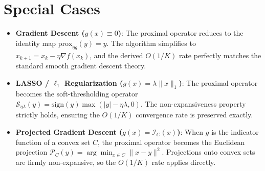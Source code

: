 \documentclass{article}
\begin{document}
\section*{Special Cases}
\begin{itemize}
\item \textbf{Gradient Descent ($g(x) \equiv 0$)}: The proximal operator reduces to the identity map $\text{prox}_{\eta g}(y) = y$. The algorithm simplifies to $x_{k+1} = x_k - \eta \nabla f(x_k)$, and the derived $O(1/K)$ rate perfectly matches the standard smooth gradient descent theory.
\item \textbf{LASSO / $\ell_1$ Regularization ($g(x) = \lambda \|x\|_1$)}: The proximal operator becomes the soft-thresholding operator $\mathcal{S}_{\eta \lambda}(y) = \text{sign}(y) \max(|y| - \eta \lambda, 0)$. The non-expansiveness property strictly holds, ensuring the $O(1/K)$ convergence rate is preserved exactly.
\item \textbf{Projected Gradient Descent ($g(x) = \mathcal{I}_C(x)$)}: When $g$ is the indicator function of a convex set $C$, the proximal operator becomes the Euclidean projection $\mathcal{P}_C(y) = \arg\min_{x \in C} \|x - y\|^2$. Projections onto convex sets are firmly non-expansive, so the $O(1/K)$ rate applies directly.
\end{itemize}
\end{document}
